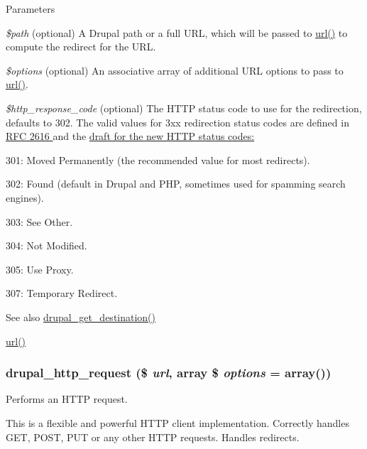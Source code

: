 \begin{DoxyParams}{Parameters}
\item[{\em \$path}](optional) A Drupal path or a full URL, which will be passed to \hyperlink{common_8inc_a43b2a0594431556db49df980801d8807}{url()} to compute the redirect for the URL. \item[{\em \$options}](optional) An associative array of additional URL options to pass to \hyperlink{common_8inc_a43b2a0594431556db49df980801d8807}{url()}. \item[{\em \$http\_\-response\_\-code}](optional) The HTTP status code to use for the redirection, defaults to 302. The valid values for 3xx redirection status codes are defined in \hyperlink{}{RFC 2616 } and the \hyperlink{}{draft for the new HTTP status codes: }
\begin{DoxyItemize}
\item 301: Moved Permanently (the recommended value for most redirects).
\item 302: Found (default in Drupal and PHP, sometimes used for spamming search engines).
\item 303: See Other.
\item 304: Not Modified.
\item 305: Use Proxy.
\item 307: Temporary Redirect.
\end{DoxyItemize}\end{DoxyParams}
\begin{DoxySeeAlso}{See also}
\hyperlink{group__http__handling_ga0c95c16e75ac4df882686daccc1f8ac5}{drupal\_\-get\_\-destination()} 

\hyperlink{common_8inc_a43b2a0594431556db49df980801d8807}{url()} 
\end{DoxySeeAlso}
\hypertarget{group__http__handling_gaad3affacd718b960300dcdddefa518aa}{
\subsubsection[{drupal\_\-http\_\-request}]{\setlength{\rightskip}{0pt plus 5cm}drupal\_\-http\_\-request (\$ {\em url}, \/  array \$ {\em options} = {\ttfamily array()})}}
\label{group__http__handling_gaad3affacd718b960300dcdddefa518aa}
Performs an HTTP request.

This is a flexible and powerful HTTP client implementation. Correctly handles GET, POST, PUT or any other HTTP requests. Handles redirects.



